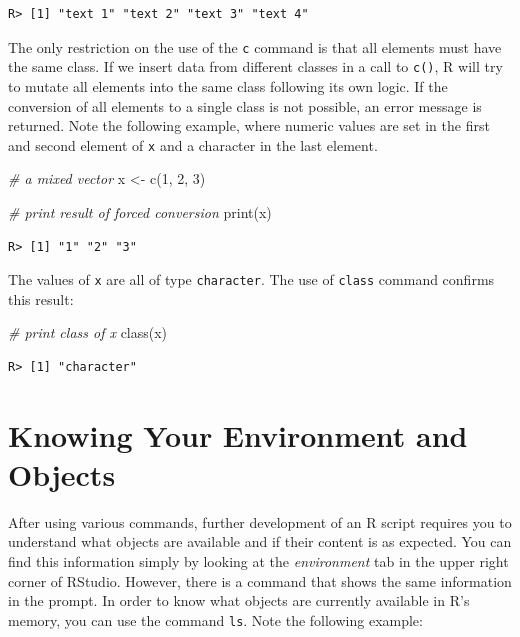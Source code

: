 \documentclass[
  12pt,
]{book}
\newenvironment{Shaded}{\begin{snugshade}}{\end{snugshade}}
\newcommand{\CommentTok}[1]{\textcolor[rgb]{0.37,0.37,0.37}{\textit{#1}}}
\newcommand{\DecValTok}[1]{\textcolor[rgb]{0.06,0.06,0.06}{#1}}
\newcommand{\FunctionTok}[1]{\textcolor[rgb]{0,0,0}{#1}}
\newcommand{\NormalTok}[1]{#1}
\newcommand{\OtherTok}[1]{\textcolor[rgb]{0.37,0.37,0.37}{#1}}
\newcommand{\StringTok}[1]{\textcolor[rgb]{0.5,0.5,0.5}{#1}}
\begin{document}
\begin{verbatim}
R> [1] "text 1" "text 2" "text 3" "text 4"
\end{verbatim}

The only restriction on the use of the \texttt{c} command is that all elements must have the same class. If we insert data from different classes in a call to \texttt{c()}, R will try to mutate all elements into the same class following its own logic. If the conversion of all elements to a single class is not possible, an error message is returned. Note the following example, where numeric values are set in the first and second element of \texttt{x} and a character in the last element.

\begin{Shaded}
\begin{Highlighting}[]
\CommentTok{\# a mixed vector}
\NormalTok{x }\OtherTok{\textless{}{-}} \FunctionTok{c}\NormalTok{(}\DecValTok{1}\NormalTok{, }\DecValTok{2}\NormalTok{, }\StringTok{\textquotesingle{}3\textquotesingle{}}\NormalTok{)}

\CommentTok{\# print result of forced conversion}
\FunctionTok{print}\NormalTok{(x)}
\end{Highlighting}
\end{Shaded}

\begin{verbatim}
R> [1] "1" "2" "3"
\end{verbatim}

The values of \texttt{x} are all of type \texttt{character}. The use of \texttt{class} command confirms this result:

\begin{Shaded}
\begin{Highlighting}[]
\CommentTok{\# print class of x}
\FunctionTok{class}\NormalTok{(x)}
\end{Highlighting}
\end{Shaded}

\begin{verbatim}
R> [1] "character"
\end{verbatim}

\hypertarget{knowing-your-environment-and-objects}{%
\section{Knowing Your Environment and Objects}\label{knowing-your-environment-and-objects}}

After using various commands, further development of an R script requires you to understand what objects are available and if their content is as expected. You can find this information simply by looking at the \emph{environment} tab in the upper right corner of RStudio. However, there is a command that shows the same information in the prompt. In order to know what objects are currently available in R's memory, you can use the command \texttt{ls}. Note the following example: 
\end{document}
